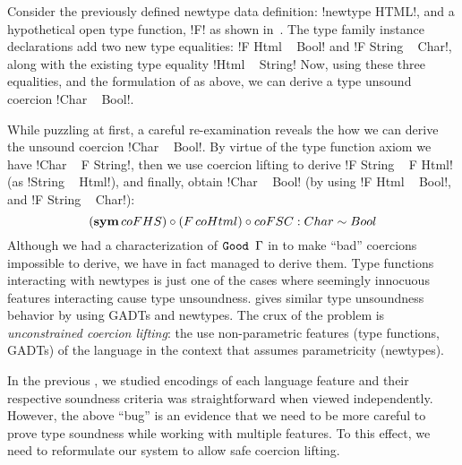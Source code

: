 \documentclass[screen,nonacm,manuscript,review]{acmart} %
\begin{document}
Consider the previously defined newtype data definition:
!newtype HTML!, and a hypothetical open type
function, !F! as shown in~.
The type family instance declarations add
two new type equalities: !F Html ~ Bool! and !F String ~ Char!,
along with the existing type equality !Html ~ String!
Now, using these three equalities, and the formulation of \SFC as
above, we can derive a type unsound coercion !Char ~ Bool!.

While puzzling at first, a careful re-examination reveals the
how we can derive the unsound coercion !Char ~ Bool!.
By virtue of the type function axiom we have !Char ~ F String!,
then we use coercion lifting to derive !F String ~ F Html!
(as !String ~ Html!), and finally, obtain !Char ~ Bool!
(by using !F Html ~ Bool!, and !F String ~ Char!):
\[
{{(\textbf{sym}\,{c}oFHS)} \circ {(F\,coHtml)}} \circ {coFSC} : Char \sim Bool
\]
Although we had a characterization of $\texttt{Good~}\Gamma$ in
 to make ``bad'' coercions
impossible to derive, we have in fact managed to derive them.
Type functions interacting with newtypes is just one of the cases where
seemingly innocuous features interacting cause type unsoundness.
\citet{weirich_generative_2011} gives similar type unsoundness behavior
by using GADTs and newtypes. The crux of the problem is
\emph{unconstrained coercion lifting}: the use non-parametric
features (type functions, GADTs) of the language in the context that assumes
parametricity (newtypes).

In the previous , we studied \SFC
encodings of each language feature and their respective soundness
criteria was straightforward when viewed independently.
However, the above ``bug'' is an evidence that we need to be more
careful to prove type soundness while working with multiple features.
To this effect, we need to reformulate our system to allow safe coercion lifting.
\end{document}
